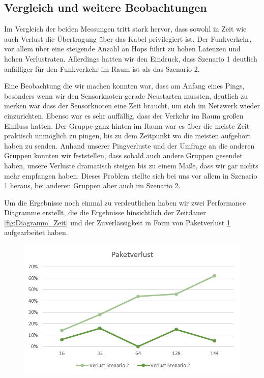 \documentclass[]{scrartcl}
\begin{document}
\subsection{Vergleich und weitere Beobachtungen}

Im Vergleich der beiden Messungen tritt stark hervor, dass sowohl in Zeit wie auch Verlust die Übertragung über das Kabel privilegiert ist. Der Funkverkehr, vor allem über eine steigende Anzahl an Hops führt zu hohen Latenzen und hohen Verlustraten. Allerdings hatten wir den Eindruck, dass Szenario 1 deutlich anfälliger für den Funkverkehr im Raum ist als das Szenario 2.

Eine Beobachtung die wir machen konnten war, dass am Anfang eines Pings, besonders wenn wir den Sensorknoten gerade Neustarten mussten, deutlich zu merken war dass der Sensorknoten eine Zeit braucht, um sich im Netzwerk wieder einzurichten. Ebenso war es sehr auffällig, dass der Verkehr im Raum großen Einfluss hatten. Der Gruppe ganz hinten im Raum war es über die meiste Zeit praktisch unmöglich zu pingen, bis zu dem Zeitpunkt wo die meisten aufgehört haben zu senden. Anhand unserer Pingverluste und der Umfrage an die anderen Gruppen konnten wir feststellen, dass sobald auch andere Gruppen gesendet haben, unsere Verluste dramatisch steigen bis zu einem Maße, dass wir gar nichts mehr empfangen haben. Dieses Problem stellte sich bei uns vor allem in Szenario 1 heraus, bei anderen Gruppen aber auch im Szenario 2.

Um die Ergebnisse noch einmal zu verdeutlichen haben wir zwei Performance Diagramme erstellt, die die Ergebnisse hinsichtlich der Zeitdauer \ref{fig:Diagramm_Zeit} und der Zuverlässigkeit in Form von Paketverlust \ref{fig:Diagramm_Paketverlust} aufgearbeitet haben.

\begin{figure}[H]
	\centering
	\includegraphics[width=1\linewidth]{Paketverlust.png}
	\label{fig:Diagramm_Paketverlust}
\end{figure}
\end{document}
